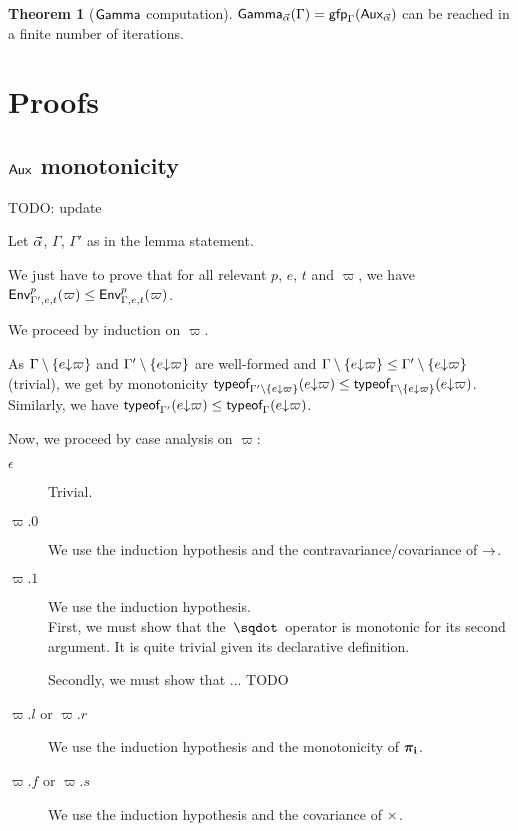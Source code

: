 \documentclass[a4paper]{article}
\theoremstyle{definition}
\newtheorem{theorem}{Theorem}
\begin{document}
        \begin{theorem}[$\textsf{Gamma}_{}$ computation]
          $\textsf{Gamma}_{\vec \alpha}(\Gamma)=\textsf{gfp}_\Gamma (\textsf{Aux}_{\vec \alpha})$ can be reached in a finite number of iterations.
        \end{theorem}

    \section{Proofs}

    \subsection{$\textsf{Aux}_{}$ monotonicity} TODO: update

      Let $\vec \alpha$, $\Gamma$, $\Gamma'$ as in the lemma statement.

      We just have to prove that for all relevant $p$, $e$, $t$ and $\varpi$, we have $\textsf{Env}^{p}_{\Gamma',e,t} (\varpi) \leq \textsf{Env}^{p}_{\Gamma,e,t} (\varpi)$.

      We proceed by induction on $\varpi$. 

      As $\Gamma\setminus\{e{\downarrow}\varpi\}$ and $\Gamma'\setminus\{e{\downarrow}\varpi\}$ are well-formed and $\Gamma\setminus\{e{\downarrow}\varpi\} \leq \Gamma'\setminus\{e{\downarrow}\varpi\}$ (trivial),
      we get by monotonicity $\textsf{typeof}_{\Gamma'\setminus\{e{\downarrow}\varpi\}}(e{\downarrow}\varpi) \leq \textsf{typeof}_{\Gamma\setminus\{e{\downarrow}\varpi\}}(e{\downarrow}\varpi)$.
      Similarly, we have $\textsf{typeof}_{\Gamma'}(e{\downarrow}\varpi) \leq \textsf{typeof}_{\Gamma}(e{\downarrow}\varpi)$.

      Now, we proceed by case analysis on $\varpi$:
      \begin{description}
        \item[$\epsilon$] Trivial.
        \item[$\varpi.0$] We use the induction hypothesis and the contravariance/covariance of $\to$.
        \item[$\varpi.1$] We use the induction hypothesis.\\
        First, we must show that the $\worra {} {}$ operator is monotonic for its second argument.
        It is quite trivial given its declarative definition.

        Secondly, we must show that ... TODO
        \item[$\varpi.l$ or $\varpi.r$] We use the induction hypothesis and the monotonicity of $\boldsymbol{\pi}_{\mathbf{i}}$.
        \item[$\varpi.f$ or $\varpi.s$] We use the induction hypothesis and the covariance of $\times$.
      \end{description}
    
\end{document}
